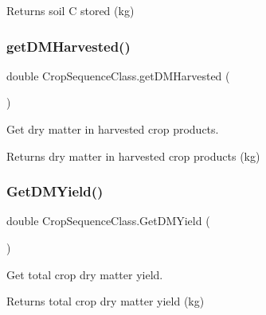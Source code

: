 \begin{DoxyReturn}{Returns}
soil C stored (kg) 
\end{DoxyReturn}
\mbox{\label{class_crop_sequence_class_a030d38e4cb8fb6c2185899a774e6df57}} 
\subsubsection{\texorpdfstring{getDMHarvested()}{getDMHarvested()}}
{\footnotesize\ttfamily double Crop\+Sequence\+Class.\+get\+D\+M\+Harvested (\begin{DoxyParamCaption}{ }\end{DoxyParamCaption})\hspace{0.3cm}{\ttfamily [inline]}}



Get dry matter in harvested crop products. 

\begin{DoxyReturn}{Returns}
dry matter in harvested crop products (kg) 
\end{DoxyReturn}
\mbox{\label{class_crop_sequence_class_a0e8e7c933602b0e5ba2da6782206ad95}} 
\subsubsection{\texorpdfstring{GetDMYield()}{GetDMYield()}}
{\footnotesize\ttfamily double Crop\+Sequence\+Class.\+Get\+D\+M\+Yield (\begin{DoxyParamCaption}{ }\end{DoxyParamCaption})\hspace{0.3cm}{\ttfamily [inline]}}



Get total crop dry matter yield. 

\begin{DoxyReturn}{Returns}
total crop dry matter yield (kg) 
\end{DoxyReturn}
\mbox{\label{class_crop_sequence_class_a2e02c66c8af9fcd82010a21360fb1553}} 
